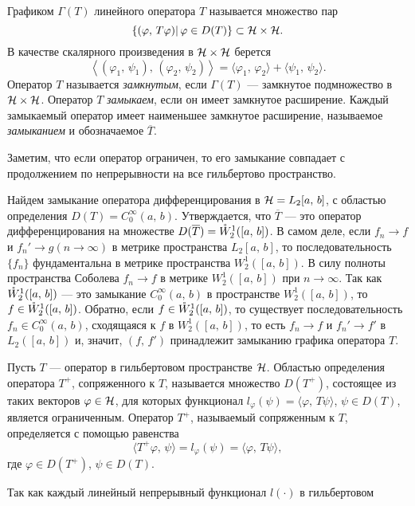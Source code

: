 \documentclass[a4paper
]{article}
\begin{document}
Графиком $\Gamma(T)$ линейного оператора $T$ называется множество
пар $$\{(\varphi, \, T\varphi)| \, \varphi\in D(T)\}\subset {\cal H}\times
{\cal H}.$$
В качестве скалярного произведения в ${\cal H}\times {\cal H}$ берется
$$\left\langle(\varphi_1, \, \psi_1),\, (\varphi_2, \, \psi_2)\right\rangle
=\langle \varphi_1, \, \varphi_2\rangle+\langle \psi_1, \, \psi_2\rangle.$$
Оператор $T$ называется {\it замкнутым}, если $\Gamma(T)$ --- замкнутое
подмножество в ${\cal H}\times{\cal H}$. Оператор $T$ {\it замыкаем},
если он имеет замкнутое расширение. Каждый замыкаемый оператор имеет
наименьшее замкнутое расширение, называемое {\it замыканием} и
обозначаемое $\overline{T}$. \par
Заметим, что если оператор ограничен, то его замыкание совпадает с
продолжением по непрерывности на все гильбертово пространство. \par
Найдем замыкание оператора дифференцирования в ${\cal H}=L_2[a, \, b]$,
с областью определения $D(T)=C_0^\infty(a, \, b)$. Утверждается,
что $\overline{T}$ --- это оператор дифференцирования на множестве
$D(\overline{T})=\mathaccent'27 W^1_2([a, \, b])$. В самом деле, если
$f_n\rightarrow f$ и $f_n'\rightarrow g(n\rightarrow \infty)$ в метрике
пространства $L_2[a, \, b]$, то последовательность $\{f_n\}$ фундаментальна
в метрике пространства $W^1_2([a, \, b])$. В силу полноты пространства
Соболева $f_n\rightarrow f$ в метрике $W^1_2([a, \,b])$ при $n\rightarrow \infty$.
Так как $\mathaccent'27 W^1_2([a, \, b])$ --- это замыкание
$C_0^\infty(a, \, b)$ в пространстве $W^1_2([a, \, b])$, то $f\in
\mathaccent'27 W^1_2([a, \, b])$. Обратно, если $f\in \mathaccent'27
W^1_2([a, \, b])$, то существует последовательность $f_n\in C_0^\infty
(a, \, b)$, сходящаяся к $f$ в $W^1_2([a, \, b])$, то есть $f_n
\rightarrow f$ и $f_n'\rightarrow f'$ в $L_2([a, \, b])$ и, значит,
$(f, \, f')$ принадлежит замыканию графика оператора $T$.
\begin{Def}
Пусть $T$ --- оператор в гильбертовом пространстве ${\cal H}$. Областью
определения оператора $T^+$, сопряженного к $T$, называется множество
$D(T^+)$, состоящее из таких векторов $\varphi\in {\cal H}$, для
которых функционал $l_\varphi(\psi)=\langle \varphi, \, T\psi\rangle$,
$\psi\in D(T)$, является ограниченным. Оператор $T^+$, называемый
сопряженным к $T$, определяется с помощью равенства $$\langle T^+\varphi,
\, \psi\rangle=l_\varphi(\psi)=\langle \varphi, \, T\psi\rangle,$$
где $\varphi\in D(T^+)$, $\psi\in D(T)$.
\end{Def}
Так как каждый линейный непрерывный функционал $l(\cdot)$ в гильбертовом
\end{document}
